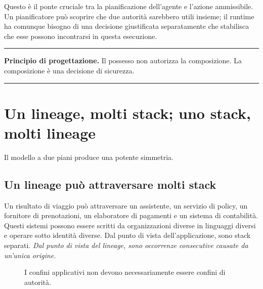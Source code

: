 \documentclass[10pt,oneside,openany]{book}
\newcommand{\principle}[1]{%
  \vspace{4pt}
  \noindent\begin{minipage}{\linewidth}
  \hrule\vspace{5pt}
  \small\sffamily\raggedright\textbf{Principio di progettazione.} #1
  \vspace{5pt}\hrule
  \end{minipage}\vspace{4pt}
}
\begin{document}
Questo è il ponte cruciale tra la pianificazione dell'agente e l'azione ammissibile. Un pianificatore può scoprire che due autorità sarebbero utili insieme; il runtime ha comunque bisogno di una decisione giustificata separatamente che stabilisca che esse possono incontrarsi in questa esecuzione.

\principle{Il possesso non autorizza la composizione. La composizione è una decisione di sicurezza.}

\chapter{Un lineage, molti stack; uno stack, molti lineage}

Il modello a due piani produce una potente simmetria.

\section{Un lineage può attraversare molti stack}
Un risultato di viaggio può attraversare un assistente, un servizio di policy, un fornitore di prenotazioni, un elaboratore di pagamenti e un sistema di contabilità. Questi sistemi possono essere scritti da organizzazioni diverse in linguaggi diversi e operare sotto identità diverse. Dal punto di vista dell'applicazione, sono stack separati. \emph{Dal punto di vista del lineage, sono occorrenze consecutive causate da un'unica origine.}

\begin{figure}[ht]
\centering
{}
\caption{I confini applicativi non devono necessariamente essere confini di autorità.}
\end{figure}
\end{document}
